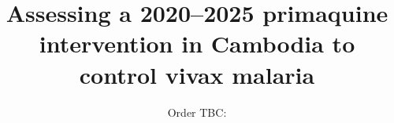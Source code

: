 \documentclass[doublespacing]{bmcart}
\begin{document}
\begin{frontmatter}

\begin{fmbox}


\title{Assessing a 2020--2025 primaquine intervention in Cambodia to control vivax malaria}


\author[
   addressref={melbms,melbph,bi},                   %
   email={r.hickson@UNSWalumni.com}   %
]{Order TBC:  }
%
\author[
   addressref={bi},
   email={rowan.martin-hughes@burnet.edu.au}
]{ }
%
\author[
   addressref={menzies},
   email={angela.devine@menzies.edu.au}
]{ }
%
\author[
   addressref={melbph,doherty},
   email={david.price1@unimelb.edu.au}
]{ }
\author[
   addressref={bi},
   email={freya.fowkes@burnet.edu.au}
]{ }
%
\author[
   addressref={melbms,melbph,doherty},
   email={jamesm@unimelb.edu.au}
]{ }
%
\author[
   addressref={melbph},
   email={julieas@unimelb.edu.au}
]{ }
%
\author[
   addressref={cnm},
   email={sivsovannaroths@gmail.com}
]{ }
%
\author[
   addressref={menzies},
   email={kamala.ley-thriemer@menzies.edu.au}
]{ }
%
\author[
   addressref={cnm,moru},
   email={pengby@email.com}
]{ }


\end{fmbox}
\end{frontmatter}
\end{document}
